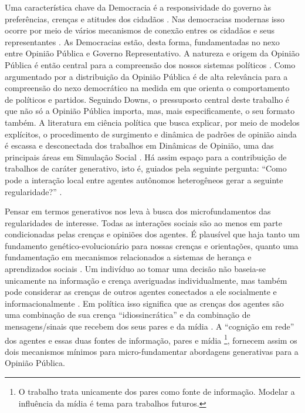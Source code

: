 Uma característica chave da Democracia é a responsividade do governo às
preferências, crenças e atitudes dos cidadãos
\cite{dahl1989democracy,bartels2003democracy}. Nas democracias modernas isso
ocorre por meio de vários mecanismos de conexão entres os cidadãos e seus
representantes \cite{dahl1989democracy, schumpeter2013capitalism}. As
Democracias estão, desta forma, fundamentadas no nexo entre Opinião Pública e
Governo Representativo. A natureza e origem da Opinião Pública é então central
para a compreensão dos nossos sistemas políticos \cite{berelson1952democratic}.
Como argumentado por  a distribuição da Opinião
Pública é de alta relevância para a compreensão do nexo democrático na medida em
que orienta o comportamento de políticos e partidos. Seguindo Downs, o
pressuposto central deste trabalho é que não só a Opinião Pública importa, mas,
mais especificamente, o seu formato também. A literatura em ciência política que
busca explicar, por meio de modelos explícitos, o procedimento de surgimento e
dinâmica de padrões de opinião ainda é escassa e desconectada dos trabalhos em
Dinâmicas de Opinião, uma das principais áreas em Simulação Social
\cite{lorenz2017modeling, laver2011party, hauke2017recent}. Há assim espaço para
a contribuição de trabalhos de caráter generativo, isto é, guiados pela seguinte
pergunta: ``Como pode a interação local entre agentes autônomos heterogêneos
gerar a seguinte regularidade?'' \cite{epstein2006generative}.

Pensar em termos generativos nos leva à busca dos microfundamentos das
regularidades de interesse. Todas as interações sociais são ao menos em parte
condicionadas pelas crenças e opiniões dos agentes. É plausível que haja tanto
um fundamento genético-evolucionário para nossas crenças e orientações, quanto
uma fundamentação em mecanismos relacionados a sistemas de herança e
aprendizados sociais \cite{jablonka2014evolution, fowler2008biology,
  fowler2013defense}. Um indivíduo ao tomar uma decisão não baseia-se unicamente
na informação e crença averiguadas individualmente, mas também pode considerar
as crenças de outros agentes conectados a ele socialmente e informacionalmente
\cite{gintis2016individuality}. Em política isso significa que as crenças dos
agentes são uma combinação de sua crença ``idiossincrática'' e da combinação de
mensagens/sinais que recebem dos seus pares e da mídia
\cite{barabas2004deliberation,ryan2011social}. A ``cognição em rede''
\cite{gintis2016individuality} dos agentes e essas duas fontes de informação,
pares e mídia \footnote{O trabalho trata unicamente dos pares como fonte de
  informação. Modelar a influência da mídia é tema para trabalhos futuros.},
fornecem assim os dois mecanismos mínimos para micro-fundamentar abordagens
generativas para a Opinião Pública.

